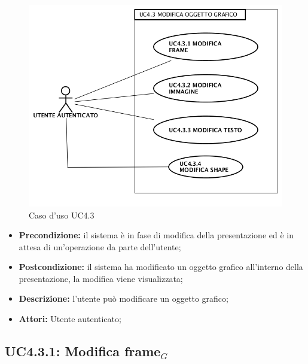 \begin{figure}[h]
	\begin{center}
	\includegraphics[scale=0.4]{diagram/UC4-3.png}
	\caption{Caso d'uso UC4.3}
	\end{center}
\end{figure}
\begin{itemize}
	\item \textbf{Precondizione:} il sistema è in fase di modifica della presentazione ed è in attesa di un'operazione da parte dell'utente;
	\item \textbf{Postcondizione:} il sistema ha modificato un oggetto grafico all'interno della presentazione, la modifica viene visualizzata;
	\item \textbf{Descrizione:} l'utente può modificare un oggetto grafico;
	\item \textbf{Attori:} Utente autenticato;
\end{itemize}
\subsection{ UC4.3.1: Modifica frame$_G$}

